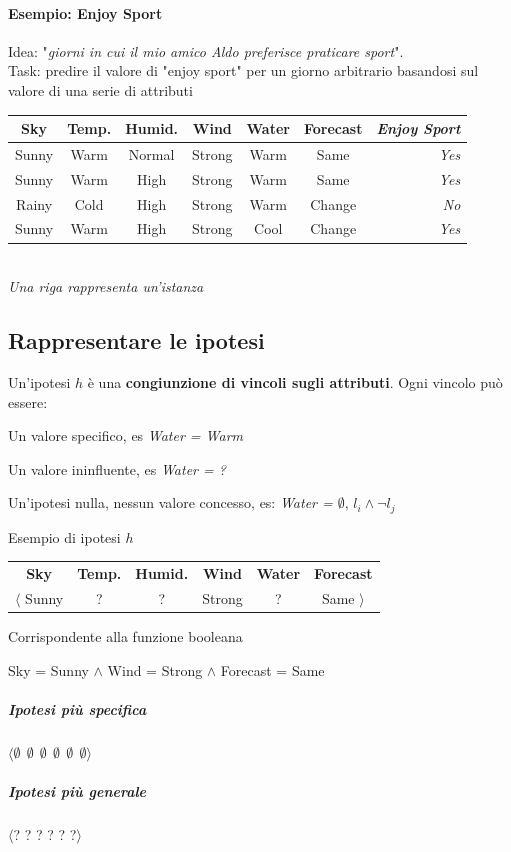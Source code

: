 \documentclass[10pt]{book}
\begin{document}
\paragraph{Esempio: Enjoy Sport} Idea: "\textit{giorni in cui il mio amico Aldo preferisce praticare sport}".\\
Task: predire il valore di "enjoy sport" per un giorno arbitrario basandosi sul valore di una serie di attributi
\begin{center}
\begin{tabular}{c c c c c c r}
\textbf{Sky} & \textbf{Temp.} & \textbf{Humid.} & \textbf{Wind} & \textbf{Water} & \textbf{Forecast} & \textit{\textbf{Enjoy Sport}}\\
\hline
Sunny & Warm & Normal & Strong & Warm & Same & \textit{Yes}\\
Sunny & Warm & High & Strong & Warm & Same & \textit{Yes}\\
Rainy & Cold & High & Strong & Warm & Change & \textit{No}\\
Sunny & Warm & High & Strong & Cool & Change & \textit{Yes}\\
\end{tabular}\\
\textit{Una riga rappresenta un'istanza}
\end{center}
\subsection{Rappresentare le ipotesi}
Un'ipotesi $h$ è una \textbf{congiunzione di vincoli sugli attributi}. Ogni vincolo può essere:
\begin{list}{}{}
	\item Un valore specifico, es \textit{Water = Warm}
	\item Un valore ininfluente, es \textit{Water = ?}
	\item Un'ipotesi nulla, nessun valore concesso, es: \textit{Water = $\emptyset$}, \textit{$l_i \wedge \neg l_j$}
\end{list}
Esempio di ipotesi $h$
\begin{center}
\begin{tabular}{c c c c c c}
\textbf{Sky} & \textbf{Temp.} & \textbf{Humid.} & \textbf{Wind} & \textbf{Water} & \textbf{Forecast}\\
$\langle$ Sunny & ? & ? & Strong & ? & Same $\rangle$
\end{tabular}
\end{center}
Corrispondente alla funzione booleana
\begin{center}
Sky = Sunny $\wedge$ Wind = Strong $\wedge$ Forecast = Same
\end{center}
\subparagraph{Ipotesi più specifica} $\langle\emptyset\:\:\emptyset\:\:\emptyset\:\:\emptyset\:\:\emptyset\:\:\emptyset\rangle$
\subparagraph{Ipotesi più generale} $\langle$? ? ? ? ? ?$\rangle$
\end{document}
